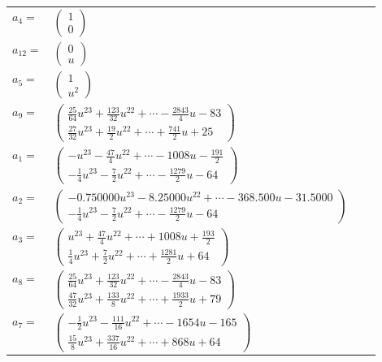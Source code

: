 \documentclass[1p]{elsarticle_modified}
\theoremstyle{definition}
\begin{document}
\begin{tabular}{m{7pt} m{180pt} m{7pt} m{180pt} }
\flushright $a_{4}=$&$\begin{pmatrix}1\\0\end{pmatrix}$ \\
\flushright $a_{12}=$&$\begin{pmatrix}0\\u\end{pmatrix}$ \\
\flushright $a_{5}=$&$\begin{pmatrix}1\\u^2\end{pmatrix}$ \\
\flushright $a_{9}=$&$\begin{pmatrix}\frac{25}{64} u^{23}+\frac{123}{32} u^{22}+\cdots-\frac{2843}{4} u-83\\\frac{27}{32} u^{23}+\frac{19}{2} u^{22}+\cdots+\frac{741}{2} u+25\end{pmatrix}$ \\
\flushright $a_{1}=$&$\begin{pmatrix}- u^{23}-\frac{47}{4} u^{22}+\cdots-1008 u-\frac{191}{2}\\-\frac{1}{4} u^{23}-\frac{7}{2} u^{22}+\cdots-\frac{1279}{2} u-64\end{pmatrix}$ \\
\flushright $a_{2}=$&$\begin{pmatrix}-0.750000 u^{23}-8.25000 u^{22}+\cdots-368.500 u-31.5000\\-\frac{1}{4} u^{23}-\frac{7}{2} u^{22}+\cdots-\frac{1279}{2} u-64\end{pmatrix}$ \\
\flushright $a_{3}=$&$\begin{pmatrix}u^{23}+\frac{47}{4} u^{22}+\cdots+1008 u+\frac{193}{2}\\\frac{1}{4} u^{23}+\frac{7}{2} u^{22}+\cdots+\frac{1281}{2} u+64\end{pmatrix}$ \\
\flushright $a_{8}=$&$\begin{pmatrix}\frac{25}{64} u^{23}+\frac{123}{32} u^{22}+\cdots-\frac{2843}{4} u-83\\\frac{47}{32} u^{23}+\frac{133}{8} u^{22}+\cdots+\frac{1933}{2} u+79\end{pmatrix}$ \\
\flushright $a_{7}=$&$\begin{pmatrix}-\frac{1}{2} u^{23}-\frac{111}{16} u^{22}+\cdots-1654 u-165\\\frac{15}{8} u^{23}+\frac{337}{16} u^{22}+\cdots+868 u+64\end{pmatrix}$ \\

\end{tabular}
\end{document}
